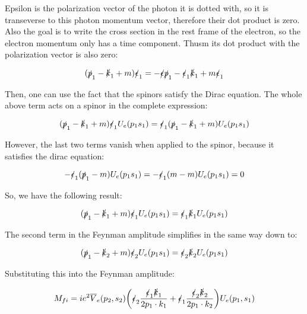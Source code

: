 \documentclass[a4]{article}
\begin{document}
    Epsilon is the polarization vector of the photon it is dotted with, so it is transeverse to this photon momentum vector, therefore their dot product is zero. Also the goal is to write the cross section in the rest frame of the electron, so the electron momentum only
    has a time component. Thusm its dot product with the polarization vector is also zero:

    \begin{equation}
        (\slashed{p}_1 - \slashed{k}_1 + m) \slashed{\epsilon}_1 = - \slashed{\epsilon} \slashed{p}_1 - \slashed{\epsilon}_1 \slashed{k}_1 + m \slashed{\epsilon}_1
    \end{equation}

    Then, one can use the fact that the spinors satisfy the Dirac equation. The whole above term acts on a spinor in the complete expression:

    \begin{equation}
        (\slashed{p}_1 - \slashed{k}_1 + m) \slashed{\epsilon}_1 U_e (p_1 s_1) = \slashed{\epsilon}_1 (\slashed{p}_1 - \slashed{k}_1 + m) U_e (p_1 s_1)
    \end{equation}

    However, the last two terms vanish when applied to the spinor, because it satisfies the dirac equation:

    \begin{equation}
        - \slashed{\epsilon}_1 (\slashed{p}_1 - m) U_e (p_1 s_1) = - \slashed{\epsilon}_1 (m - m) U_e (p_1 s_1) = 0
    \end{equation}

    So, we have the following result:

    \begin{equation}
        (\slashed{p}_1 - \slashed{k}_1 + m) \slashed{\epsilon}_1 U_e (p_1 s_1) = \slashed{\epsilon}_1 \slashed{k}_1 U_e (p_1 s_1)
    \end{equation}

    The second term in the Feynman amplitude simplifies in the same way down to:

    \begin{equation}
        (\slashed{p}_1 - \slashed{k}_2 + m) \slashed{\epsilon}_2 U_e (p_1 s_1) = \slashed{\epsilon}_2 \slashed{k}_2 U_e (p_1 s_1)
    \end{equation}

    Substituting this into the Feynman amplitude:

    \begin{equation}
        M_{fi} = i e^2 \overline{V}_e (p_2, s_2) \bigg( \slashed{\epsilon}_2 \frac{\slashed{\epsilon}_1 \slashed{k}_1}{2 p_1 \cdot k_1} + \slashed{\epsilon}_1 \frac{\slashed{\epsilon}_2 \slashed{k}_2}{2 p_1 \cdot k_2} \bigg) U_e (p_1, s_1)
    \end{equation}
\end{document}

